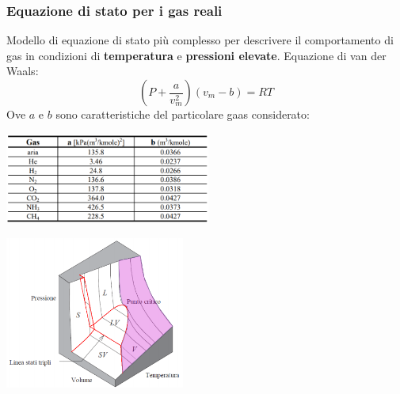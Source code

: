 \subsubsection{Equazione di stato per i gas reali}
Modello di equazione di stato più complesso per descrivere il comportamento di gas in condizioni di \textbf{temperatura} e \textbf{pressioni elevate}.\newline
\newline
Equazione di van der Waals:
\[
    \left(P + \frac{a}{v_m^2}\right)(v_m - b) = RT
\]
Ove $a$ e $b$ sono caratteristiche del particolare gaas considerato:
\begin{center}
    \includegraphics[height=3cm]{../L01/img8.PNG}
\end{center}
\begin{center}
    \includegraphics[height=5cm]{../L01/img6.PNG}
\end{center}
